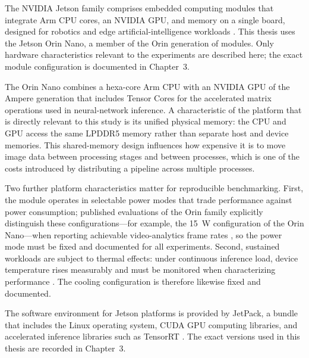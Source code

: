 The NVIDIA Jetson family comprises embedded computing modules that
integrate Arm CPU cores, an NVIDIA GPU, and memory on a single board,
designed for robotics and edge artificial-intelligence workloads
\cite{scalcon2024}. This thesis uses the Jetson Orin Nano, a member of the
Orin generation of modules. Only hardware characteristics relevant to the
experiments are described here; the exact module configuration is
documented in Chapter~3.

The Orin Nano combines a hexa-core Arm CPU with an NVIDIA GPU of the Ampere
generation that includes Tensor Cores for the accelerated matrix
operations used in neural-network inference.
A characteristic of the platform that is directly relevant to this study is
its unified physical memory: the CPU and GPU access the same LPDDR5 memory
rather than separate host and device memories.
This shared-memory design influences how expensive it is to move image
data between processing stages and between processes, which is one of the
costs introduced by distributing a pipeline across multiple processes.

Two further platform characteristics matter for reproducible benchmarking.
First, the module operates in selectable power modes that trade performance
against power consumption; published evaluations of the Orin family
explicitly distinguish these configurations---for example, the 15~W
configuration of the Orin Nano---when reporting achievable video-analytics
frame rates \cite{scalcon2024}, so the power mode must be fixed and
documented for all experiments. Second, sustained workloads are subject to
thermal effects: under continuous inference load, device temperature rises
measurably and must be monitored when characterizing performance
\cite{zequn2026}. The cooling configuration is therefore likewise fixed and
documented.

The software environment for Jetson platforms is provided by JetPack, a
bundle that includes the Linux operating system, CUDA GPU computing
libraries, and accelerated inference libraries such as TensorRT
\cite{szegedi2026, zequn2026}. The exact versions used in this thesis are
recorded in Chapter~3.

